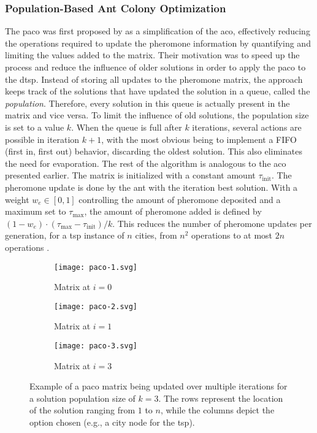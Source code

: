 \subsubsection{Population-Based Ant Colony Optimization}
The \gls{paco} was first proposed by \citet{guntsch2002population} as a simplification of the \gls{aco}, effectively reducing the operations required to update the pheromone information by quantifying and limiting the values added to the matrix. Their motivation was to speed up the process and reduce the influence of older solutions in order to apply the \gls{paco} to the \gls{dtsp}. 
Instead of storing all updates to the pheromone matrix, the approach keeps track of the solutions that have updated the solution in a queue, called the \textit{population}. Therefore, every solution in this queue is actually present in the matrix and vice versa. To limit the influence of old solutions, the population size is set to a value $k$. When the queue is full after $k$ iterations, several actions are possible in iteration $k+1$, with the most obvious being to implement a FIFO (first in, first out) behavior, discarding the oldest solution. This also eliminates the need for evaporation. The rest of the algorithm is analogous to the \gls{aco} presented earlier. The matrix is initialized with a constant amount $\tau_{\text{init}}$. The pheromone update is done by the ant with the iteration best solution. With a weight $w_e \in [0,1]$ controlling the amount of pheromone deposited and a maximum set to $\tau_{\text{max}}$, the amount of pheromone added is defined by $(1-w_e) \cdot (\tau_{\text{max}} - \tau_{\text{init}})/k$.
This reduces the number of pheromone updates per generation, for a \gls{tsp} instance of $n$ cities, from $n^2$ operations to at most $2n$ operations \cite{guntsch2002population}.

\begin{figure}
	\hfill
	\begin{subfigure}{.3\textwidth}
		\texttt{[image: paco-1.svg]}
		\caption{Matrix at $i=0$}
		\label{fig:paco1}
	\end{subfigure}
	\hfill
	\begin{subfigure}{.3\textwidth}
		\texttt{[image: paco-2.svg]}
		\caption{Matrix at $i=1$}
		\label{fig:paco2}
	\end{subfigure}
	\hfill
	\begin{subfigure}{.3\textwidth}
		\texttt{[image: paco-3.svg]}
		\caption{Matrix at $i=3$}
		\label{fig:paco3}
	\end{subfigure}
	\caption[Example of a \gls{paco} matrix being updated over multiple iterations]{Example of a \gls{paco} matrix being updated over multiple iterations for a solution population size of $k=3$. The rows represent the location of the solution ranging from $1$ to $n$, while the columns depict the option chosen (e.g., a city node for the \gls{tsp}).}
	\label{fig:paco}
\end{figure}

